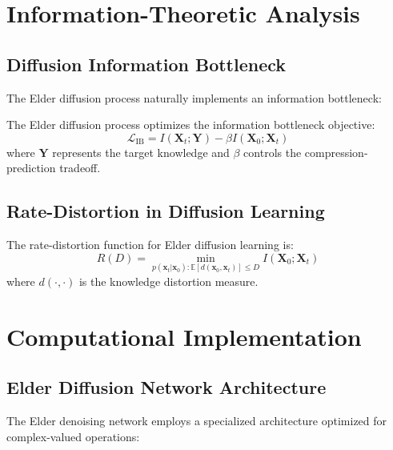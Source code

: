 \section{Information-Theoretic Analysis}

\subsection{Diffusion Information Bottleneck}

The Elder diffusion process naturally implements an information bottleneck:

\begin{theorem}
The Elder diffusion process optimizes the information bottleneck objective:
\begin{equation}
\mathcal{L}_{\text{IB}} = I(\mathbf{X}_t; \mathbf{Y}) - \beta I(\mathbf{X}_0; \mathbf{X}_t)
\end{equation}
where $\mathbf{Y}$ represents the target knowledge and $\beta$ controls the compression-prediction tradeoff.
\end{theorem}

\subsection{Rate-Distortion in Diffusion Learning}

\begin{definition}
The rate-distortion function for Elder diffusion learning is:
\begin{equation}
R(D) = \min_{p(\mathbf{x}_t|\mathbf{x}_0): \mathbb{E}[d(\mathbf{x}_0, \mathbf{x}_t)] \leq D} I(\mathbf{X}_0; \mathbf{X}_t)
\end{equation}
where $d(\cdot, \cdot)$ is the knowledge distortion measure.
\end{definition}

\section{Computational Implementation}

\subsection{Elder Diffusion Network Architecture}

The Elder denoising network employs a specialized architecture optimized for complex-valued operations:

